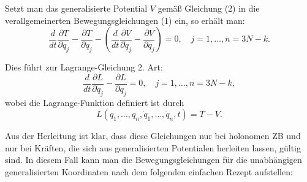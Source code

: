 \documentclass[10pt, letterpaper]{article}
\begin{document}
Setzt man das generalisierte Potential \( V \) gemäß Gleichung (2) in die verallgemeinerten Bewegungsgleichungen (1) ein, so erhält man:
\[
\frac{d}{dt} \frac{\partial T}{\partial \dot{q}_j} - \frac{\partial T}{\partial q_j} 
- \left( \frac{d}{dt} \frac{\partial V}{\partial \dot{q}_j} - \frac{\partial V}{\partial q_j} \right) = 0, 
\quad j = 1, \dotsc, n = 3N - k.
\]

Dies führt zur Lagrange-Gleichung 2. Art:
\begin{equation*}
\frac{d}{dt} \frac{\partial L}{\partial \dot{q}_j} - \frac{\partial L}{\partial q_j} = 0, 
\quad j = 1, \dotsc, n = 3N - k,
\end{equation*}
wobei die Lagrange-Funktion definiert ist durch
\[
L(q_1, \dotsc, q_n, \dot{q}_1, \dotsc, \dot{q}_n, t) = T - V.
\]



Aus der Herleitung ist klar, dass diese Gleichungen nur bei holonomen ZB und nur bei Kräften, die sich aus generalisierten Potentialen herleiten lassen, gültig sind. In diesem Fall kann man die Bewegungsgleichungen für die unabhängigen generalisierten Koordinaten nach dem folgenden einfachen Rezept aufstellen:
\end{document}
